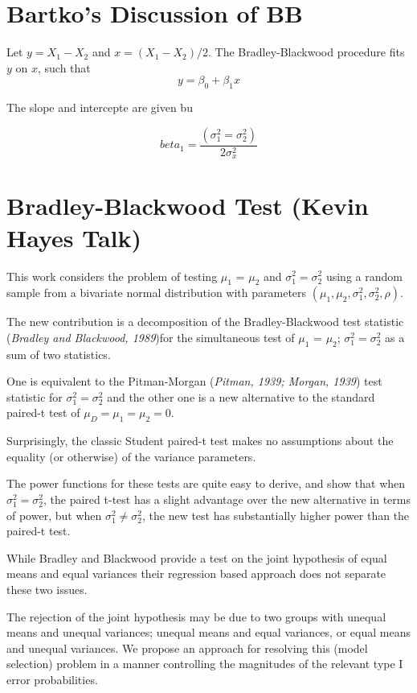 \documentclass[12pt, a4paper]{report}
\theoremstyle{plain}
\theoremstyle{definition}
\theoremstyle{remark}
\begin{document}
	
	
\section*{Bartko's Discussion of BB}

Let $y = X_1 - X_2$ and $x= (X_1 - X_2)/2$.
The Bradley-Blackwood procedure fits $y$ on $x$, such that
\[ y = \beta_0 + \beta_1x \]

The slope and intercepte are given bu

\[beta_1 =  \frac{(\sigma^2_1 = \sigma^2_2)}{2\sigma^2_x}\]


	\section{Bradley-Blackwood Test (Kevin Hayes Talk)}
	
	This work considers the problem of testing $\mu_1$ = $\mu_2$ and $\sigma^2_1 = \sigma^2_2$ using a random sample from a bivariate normal distribution with parameters $(\mu_1, \mu_2, \sigma^2_1, \sigma^2_2, \rho)$. 
	
	The new contribution is a decomposition of the Bradley-Blackwood test statistic (\textit{Bradley and Blackwood, 1989})for the simultaneous test of {$\mu_1$ = $\mu_2$; $\sigma^2_1 = \sigma^2_2$}  as a sum of two statistics. 
	
	One is equivalent to the Pitman-Morgan (\textit{Pitman, 1939; Morgan, 1939}) test statistic 
	for $\sigma^2_1 = \sigma^2_2$ and the other one is a new alternative to the standard paired-t test of $\mu_D = \mu_1 = \mu_2 = 0$. 
	
	Surprisingly, the classic Student paired-t test makes no assumptions about the equality (or otherwise) of the 
	variance parameters. 
	
	The power functions for these tests are quite easy to derive, and show that when $\sigma^2_1 = \sigma^2_2$, 
	the paired t-test has a slight advantage over the new alternative in terms of power, but when $\sigma^2_1 \neq \sigma^2_2$, the 
	new test has substantially higher power than the paired-t test.
	
	While Bradley and Blackwood provide a test on the joint hypothesis of equal means and equal variances their regression based approach does not separate these two issues.
	
	The rejection of the joint hypothesis may be 
	due to two groups with unequal means and unequal variances; unequal means and equal variances, or equal means and unequal variances. We propose an approach for resolving this (model selection) problem in a manner controlling the magnitudes of the relevant type I error probabilities.
	
\end{document}
